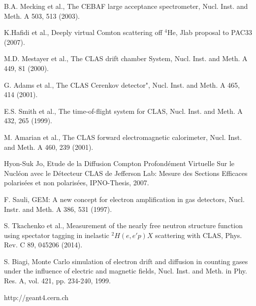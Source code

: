 \documentclass[twocolumn,showpacs,superscriptaddress,groupedaddress]{revtex4}
\begin{document}
\begin{thebibliography}{99}

   B.A. Mecking et al., The CEBAF large acceptance spectrometer, Nucl. Inst. 
   and Meth. A 503, 513 (2003).

   K.Hafidi et al., Deeply virtual Comton scattering off $^{4}$He, Jlab 
   proposal to PAC33 (2007).

   M.D. Mestayer et al., The CLAS drift chamber System, Nucl. Inst.  and Meth.  
   A 449, 81 (2000).

   G. Adams et al., The CLAS Cerenkov detector", Nucl. Inst. and Meth. A 465, 
   414 (2001).

   E.S. Smith et al., The time-of-flight system for CLAS, Nucl.  Inst. and 
   Meth. A 432, 265 (1999).

   M. Amarian et al., The CLAS forward electromagnetic calorimeter, Nucl.  
   Inst. and Meth. A 460, 239 (2001). 

   Hyon-Suk Jo, Etude de la Diffusion Compton Profond{\'e}ment Virtuelle Sur le 
   Nucl{\'e}on avec le D{\'e}tecteur CLAS de Jefferson Lab: Mesure des Sections 
   Efficaces polaris{\'e}es et non polaris{\'e}es, IPNO-Thesis, 2007.

   F. Sauli, GEM: A new concept for electron amplification in gas detectors, 
   Nucl. Instr. and Meth. A 386, 531 (1997).

   S. Tkachenko et al., Measurement of the nearly free neutron structure 
   function using spectator tagging in inelastic $^{2}H(e,e'p)X$ scattering 
   with CLAS,	Phys. Rev. C 89, 045206 (2014).

   S. Biagi, Monte Carlo simulation of electron drift and diffusion in counting 
   gases under the influence of electric and magnetic fields, Nucl.  Inst. and 
   Meth. in Phy. Res. A, vol. 421, pp. 234-240, 1999.

http://geant4.cern.ch

\end{thebibliography}
\end{document}

